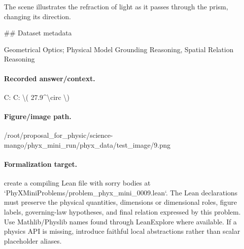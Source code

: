 The scene illustrates the refraction of light as it passes through the prism, changing its direction.

\#\# Dataset metadata

Geometrical Optics; Physical Model Grounding Reasoning, Spatial Relation Reasoning

\paragraph{Recorded answer/context.}
C: C: \textbackslash{}( 27.9\textasciicircum{}\textbackslash{}circ \textbackslash{})

\paragraph{Figure/image path.}
/root/proposal\_for\_physic/science-mango/phyx\_mini\_run/phyx\_data/test\_image/9.png

\paragraph{Formalization target.}
create a compiling Lean file with sorry bodies at `PhyXMiniProblems/problem\_phyx\_mini\_0009.lean`. The Lean declarations must preserve the physical quantities, dimensions or dimensional roles, figure labels, governing-law hypotheses, and final relation expressed by this problem.
Use Mathlib/Physlib names found through LeanExplore where available. If a physics API is missing, introduce faithful local abstractions rather than scalar placeholder aliases.

